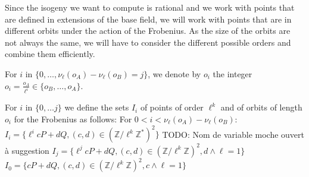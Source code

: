 \documentclass{lms}
\newcommand{\todo}[1]{{\color{red}TODO: #1}}
\begin{document}
Since the isogeny we want to compute is rational and we work with
points that are defined in extensions of the base field, we will work
with points that are in different orbits under the action of the
Frobenius. As the size of the orbits are not always the same, we will
have to consider the different possible orders and combine them
efficiently.

\begin{defi}
  For $i$ in $\{0, \dots,\nu_{\ell}(o_A)-\nu_{\ell}(o_B)=j\}$, we denote by $o_i$
  the integer $o_i =\frac{o_A}{\ell^i} \in \{o_B,\dots,o_A\}$.
\end{defi}




\begin{defi}
For $i$ in $\{0,\dots j\}$ we define the sets
$I_i$ of points of order $\ell^k$ and of orbits of length $o_i$ for the Frobenius as follows:
\newline
For $0 < i < \nu_{\ell}(o_A)-\nu_{\ell}(o_B)$:
$I_i=\{ \ell^i c P + d Q, (c,d) \in \left( \mathbb{Z}/ \ell^k \mathbb{Z}^{*} \right)^2 \} $ \todo{Nom de variable moche ouvert à suggestion}
\newline
$I_j=\{ \ell^j c P + d Q, (c,d) \in \left( \mathbb{Z}/ \ell^k \mathbb{Z} \right)^2, d \wedge \ell =1 \} $
\newline
$I_0=\{ c P + d Q, (c,d) \in \left( \mathbb{Z}/ \ell^k \mathbb{Z} \right)^2, c \wedge \ell =1 \}$
\end{defi}
\end{document}
